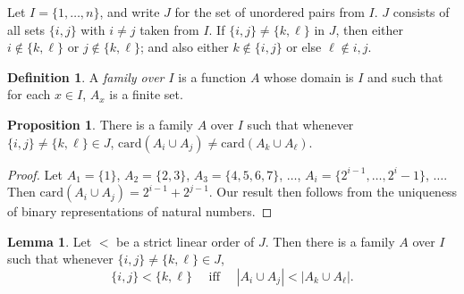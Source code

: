 \documentclass[12pt]{article}
\theoremstyle{definition}
\newtheorem{definition}{Definition}
\newtheorem{lemma}[theorem]{Lemma}
\newtheorem{proposition}{Proposition}
\newcommand{\set}[1]{\{ #1 \}}
\newcommand{\quadiff}{\quad \mbox{ iff } \quad}
\newcommand{\rem}[1]{\relax}
\newcommand{\card}{\mbox{card}}
\begin{document}
Let $I = \set{1,\ldots, n}$, and write $J$ for the set of unordered pairs from $I$.
$J$ consists of all sets $\set{i,j}$ with $i\neq j$ taken from $I$.  If $\set{i,j} \neq \set{k,\ell}$ in $J$,
then either $i \notin \set{k,\ell}$ or $j\notin \set{k,\ell}$;  and also either
$k\notin \set{i,j}$ or else $\ell\notin{i,j}$.

\begin{definition}
A \emph{family over $I$} is a 
function $A$ whose domain is $I$ 
and such that for each $x\in I$, $A_x$ is a  finite set.
\end{definition}
 
\begin{proposition}
There is a family $A$  over $I$ such that whenever
$\set{i,j} \neq \set{k,\ell} \in J$,  $ \card(A_i \cup A_j) \neq  \card(A_k \cup A_{\ell})$.
  \label{proposition-first}
  \end{proposition}
 
 \begin{proof}
 Let $A_1 = \set{1}$,
 $A_2 = \set{2,3}$, 
  $A_3 = \set{4, 5, 6, 7}$, 
  $\ldots$, 
 $A_i = \set{2^{i-1}, \ldots, 2^{i} -1}$, $\ldots$.
 Then $\card(A_i \cup A_j) = 2^{i-1} + 2^{j-1}$.  
 Our result then follows from the uniqueness of binary representations of natural numbers.
   \end{proof}
   
\rem{ Note that $A_1\cup A_3 = \set{1,2,3}$ and $A_2 \cup A_3 = \set{1,4,5,6,7}$, and $5 - 3 =2$.
 In all other cases,   $ | \card(A_i \cup A_j)-  \card(A_k \cup A_{\ell}) \ | > 2 $.
  }

  
   \begin{lemma}
 Let $<$ be a strict linear order of $J$.  Then there is a family $A$ over $I$ such that
whenever $\set{i,j} \neq \set{k,\ell} \in J$, 
 \[ \set{i,j} < \set{k,\ell} 
 \quadiff
 |A_i \cup A_j | < |A_k \cup A_{\ell}|.
 \]
 \label{lemma-J}
 \end{lemma}
 
\end{document}
